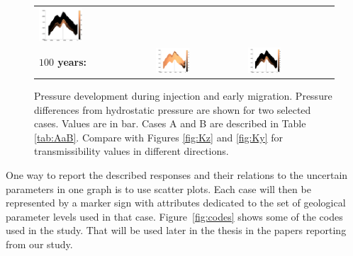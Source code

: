 \begin{figure}
\begin{tabular}{MMM}
\includegraphics[width=0.4\textwidth]{./figurer/C03211p50_slcy}\\
\textbf{$100$ years:}&
\includegraphics[width=0.4\textwidth]{./figurer/C02222p100_slcy}&
\includegraphics[width=0.4\textwidth]{./figurer/C03211p100_slcy}\\
\end{tabular}
\caption{Pressure development during injection and early migration. Pressure differences from hydrostatic pressure are shown for two selected cases. Values are in bar. Cases A and B are described in Table \ref{tab:AaB}. Compare with Figures \ref{fig:Kz} and \ref{fig:Ky} for transmissibility values in different directions.}
\label{fig:Pplume}
\end{figure}


One way to report the described responses and their relations to the uncertain
parameters in one graph is to use scatter plots. Each case will then be
represented by a marker sign with attributes dedicated to the set of geological
parameter levels used in that case. Figure~\ref{fig:codes} shows some of the
codes used in the study. That will be used later in the thesis in the papers
reporting from our study.



